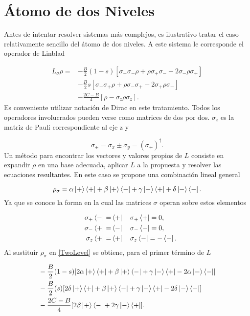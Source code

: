 \documentclass[a4paper,10pt]{report}
\begin{document}
\section{Átomo de dos Niveles}

Antes de intentar resolver sistemas más complejos, es ilustrativo tratar el caso relativamente sencillo del átomo de dos niveles. A este sistema le corresponde el operador de Linblad \cite{EnglertDB}

\begin{align}\label{TwoLevel}
 L_{\sigma}\rho = 
 &-\frac{B}{2}(1-s)[\sigma_+\sigma_-\rho + \rho\sigma_+\sigma_--2\sigma_-\rho\sigma_+ ]\nonumber\\
 &-\frac{B}{2}s[\sigma_-\sigma_+\rho + \rho\sigma_-\sigma_+-2\sigma_+\rho\sigma_- ]\nonumber\\
 &-\frac{2C-B}{4}[\rho - \sigma_z\rho\sigma_z].
\end{align} Es conveniente utilizar notación de Dirac en este tratamiento. Todos los operadores involucrados pueden verse como matrices de dos por dos. $\sigma_z$ es la matriz de Pauli correspondiente al eje z y

\begin{equation}
\sigma_{\pm} = \sigma_x \pm \sigma_y = (\sigma_{\mp}) ^\dagger.
\end{equation} Un método \cite{BarnettSD} para encontrar los vectores y valores propios de $L$ consiste en expandir $\rho$ en una base adecuada, aplicar $L$ a la propuesta y resolver las ecuaciones resultantes. En este caso se propone una combinación lineal general

\begin{equation}
\rho_\sigma = \alpha\Ket{+}\Bra{+}+\beta\Ket{+}\Bra{-}+\gamma\Ket{-}\Bra{+}+\delta\Ket{-}\Bra{-}.
\end{equation} Ya que se conoce la forma en la cual las matrices $\sigma$ operan sobre estos elementos

\begin{align*}
&&\sigma_{+}\Bra{-} =& \Bra{+} \quad \sigma_{+}\Bra{+} = 0, \\
&&\sigma_{-}\Bra{+} =& \Bra{-} \quad \sigma_{-}\Bra{-} = 0, \\
&&\sigma_{z}\Bra{+} =& \Bra{+} \quad \sigma_{z}\Bra{-} = -\Bra{-}.
\end{align*} Al sustituir $\rho_{\sigma}$ en \eqref{TwoLevel} se obtiene, para el primer término de $L$

\begin{align}
&-\frac{B}{2}(1-s)[2\alpha\Ket{+}\Bra{+}+\beta\Ket{+}\Bra{-}+\gamma\Ket{-}\Bra{+}-2\alpha\Ket{-}\Bra{-}]\\
&\nonumber -\frac{B}{2}(s)[2\delta\Ket{+}\Bra{+}+\beta\Ket{+}\Bra{-}+\gamma\Ket{-}\Bra{+}-2\delta\Ket{-}\Bra{-}]\\
&\nonumber -\frac{2C-B}{4}[2\beta\Ket{+}\Bra{-}+2\gamma\Ket{-}\Bra{+}].
\end{align}
\end{document}
